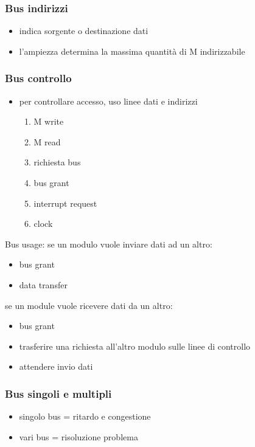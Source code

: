 \documentclass[12pt, a4paper]{article}
\theoremstyle{break}
\theoremstyle{lemma}
\theoremstyle{lemma}
\theoremstyle{lemma}
\begin{document}
\subsubsection{Bus indirizzi}
\begin{itemize}
	\item indica sorgente o destinazione dati
	\item l'ampiezza determina la massima quantità di M indirizzabile
\end{itemize}

\subsubsection{Bus controllo}
\begin{itemize}
	\item per controllare accesso, uso linee dati e indirizzi
	\begin{enumerate}
		\item M write
		\item M read
		\item richiesta bus
		\item bus grant
		\item interrupt request
		\item clock
	\end{enumerate}
\end{itemize}

Bus usage:
se un modulo vuole inviare dati ad un altro:
\begin{itemize}
	\item bus grant
	\item data transfer
\end{itemize}

se un module vuole ricevere dati da un altro:
\begin{itemize}
	\item bus grant
	\item trasferire una richiesta all'altro modulo sulle linee di controllo 
	\item attendere invio dati
\end{itemize}

\subsubsection{Bus singoli e multipli}
\begin{itemize}
	\item singolo bus = ritardo e congestione
	\item vari bus = risoluzione problema
\end{itemize}
\end{document}
